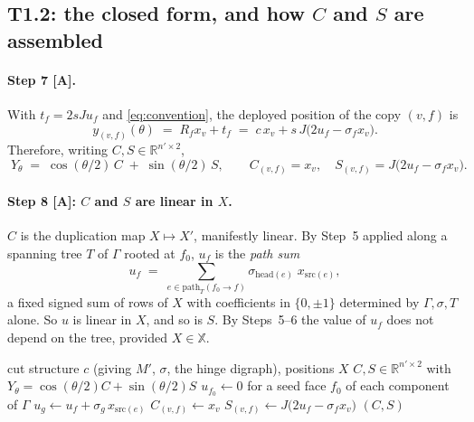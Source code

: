 \documentclass[11pt,a4paper]{article}
\theoremstyle{definition}
\newcommand{\Mprime}{M'}
\newcommand{\file}[1]{\texttt{\small #1}}
\begin{document}
\subsection{T1.2: the closed form, and how \texorpdfstring{$C$}{C} and \texorpdfstring{$S$}{S} are assembled}

\paragraph{Step 7 [A].} With $t_f=2sJu_f$ and \eqref{eq:convention}, the deployed position
of the copy $(v,f)$ is
\[
y_{(v,f)}(\theta) \;=\; R_f x_v + t_f \;=\; c\,x_v + s\,J\bigl(2u_f-\sigma_f x_v\bigr).
\]
Therefore, writing $C,S\in\mathbb{R}^{n'\times2}$,
\begin{equation}
\boxed{\;
Y_\theta \;=\; \cos(\theta/2)\,C \;+\; \sin(\theta/2)\,S ,
\qquad
C_{(v,f)}=x_v,\quad S_{(v,f)}=J\bigl(2u_f-\sigma_f x_v\bigr).
\;}
\label{eq:T15}
\end{equation}

\paragraph{Step 8 [A]: $C$ and $S$ are linear in $X$.} $C$ is the duplication map
$X\mapsto X'$, manifestly linear. By Step~5 applied along a spanning tree $T$ of $\Gamma$
rooted at $f_0$, $u_f$ is the \emph{path sum}
\begin{equation}
u_f \;=\; \sum_{e\in \mathrm{path}_T(f_0\to f)} \sigma_{\mathrm{head}(e)}\; x_{\mathrm{src}(e)} ,
\label{eq:pathsum}
\end{equation}
a fixed signed sum of rows of $X$ with coefficients in $\{0,\pm1\}$ determined by
$\Gamma,\sigma,T$ alone. So $u$ is linear in $X$, and so is $S$. By Steps~5--6 the value of
$u_f$ does not depend on the tree, provided $X\in\mathbb{X}$.

\begin{algorithm}[t]
\caption{Assembling the deploy basis $(C,S)$ --- \file{method/deploy\_basis.jl}}
\label{alg:basis}
\begin{algorithmic}[1]
\Require cut structure $c$ (giving $\Mprime$, $\sigma$, the hinge digraph), positions $X$
\Ensure $C,S\in\mathbb{R}^{n'\times2}$ with $Y_\theta=\cos(\theta/2)C+\sin(\theta/2)S$
\State $u_{f_0}\gets 0$ for a seed face $f_0$ of each component of $\Gamma$
  \State $u_g \gets u_f + \sigma_g\, x_{\mathrm{src}(e)}$ 
\EndFor
\ForAll{$\Mprime$-vertices $(v,f)$}
  \State $C_{(v,f)} \gets x_v$
  \State $S_{(v,f)} \gets J\bigl(2u_f - \sigma_f x_v\bigr)$
\EndFor
\State \Return $(C,S)$
\end{algorithmic}
\end{algorithm}
\end{document}
